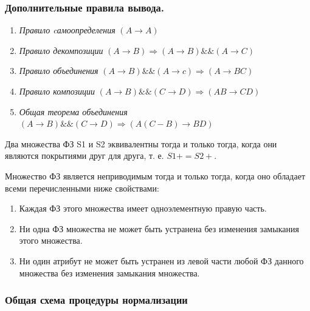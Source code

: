 \subsubsection{Дополнительные правила вывода.}

\begin{enumerate}
	\item \textit{Правило cамоопределения} $(A \to A)$
	\item \textit{Правило декомпозиции} $(A \to B) \Rightarrow (A \to B) \&\& (A \to C)$
	\item \textit{Правило объединения} $(A \to B) \&\& (A \to c) \Rightarrow (A \to BC)$
	\item \textit{Правило композиции} $(A \to B) \&\& (C \to D) \Rightarrow (AB \to CD)$
	\item \textit{Общая теорема объединения} $(A \to B) \&\& (C \to D) \Rightarrow (A(C - B) \to BD)$
\end{enumerate}

Два множества ФЗ S1 и S2 эквивалентны тогда и только тогда, когда они являются покрытиями друг для друга, т. е. $S1+ = S2+$.

Множество ФЗ является неприводимым тогда и только тогда, когда оно обладает всеми перечисленными ниже свойствами:
\begin{enumerate}
	\item Каждая ФЗ этого множества имеет одноэлементную правую часть.
	\item Ни одна ФЗ множества не может быть устранена без изменения замыкания этого множества.
	\item Ни один атрибут не может быть устранен из левой части любой ФЗ данного множества без изменения замыкания множества.
\end{enumerate}


\subsubsection{Общая схема процедуры нормализации}

